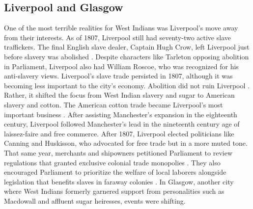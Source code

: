 \subsection{Liverpool and Glasgow}
One of the most terrible realities for West Indians was Liverpool's move away from their interests. As of 1807, Liverpool still had seventy-two active slave traffickers. The final English slave dealer, Captain Hugh Crow, left Liverpool just before slavery was abolished . Despite characters like Tarleton opposing abolition in Parliament, Liverpool also had William Roscoe, who was recognized for his anti-slavery views. Liverpool's slave trade persisted in 1807, although it was becoming less important to the city's economy. Abolition did not ruin Liverpool . Rather, it shifted the focus from West Indian slavery and sugar to American slavery and cotton. The American cotton trade became Liverpool's most important business . After assisting Manchester's expansion in the eighteenth century, Liverpool followed Manchester's lead in the nineteenth century age of laissez-faire and free commerce. After 1807, Liverpool elected politicians like Canning and Huskisson, who advocated for free trade but in a more muted tone. That same year, merchants and shipowners petitioned Parliament to review regulations that granted exclusive colonial trade monopolies . They also encouraged Parliament to prioritize the welfare of local laborers alongside legislation that benefits slaves in faraway colonies . In Glasgow, another city where West Indians formerly garnered support from personalities such as Macdowall and affluent sugar heiresses, events were shifting.
